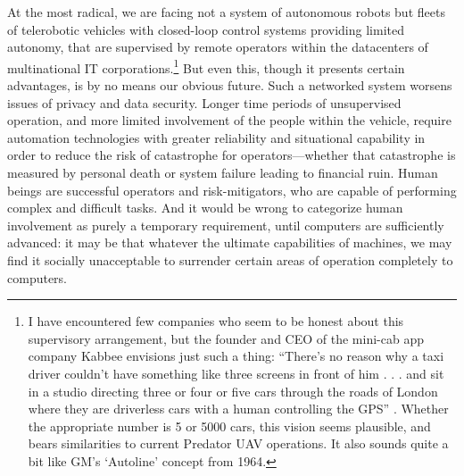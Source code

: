 
At the most radical, we are
facing not a system of autonomous robots but fleets of telerobotic
vehicles with closed-loop control systems providing limited autonomy,
that are supervised by remote operators within the datacenters of
multinational IT corporations.\footnote{I have encountered few
  companies who seem to be honest about this supervisory arrangement,
  but the founder and CEO of the mini-cab app company Kabbee envisions
just such a thing: ``There's no reason why a taxi driver couldn't have
something like three screens in front of him . . . and sit in a studio
directing three or four or five cars through the roads of London where
they are driverless cars with a human controlling the GPS''
\cite{forbesDawson}.
Whether the appropriate number is 5 or 5000 cars, this vision seems
plausible, and bears similarities to current Predator UAV operations.
It also sounds quite a bit like GM's `Autoline' concept from 1964.}
But even this, though it presents 
certain advantages, is by no means 
our obvious future. Such a networked system worsens issues of privacy
and data security. Longer time periods of unsupervised operation, and
more limited involvement of the people within the vehicle, require
automation technologies with greater reliability and situational
capability in order to reduce the risk of catastrophe for
operators---whether that catastrophe is measured by personal death or
system failure leading to financial ruin. Human beings are
successful operators and risk-mitigators, who are capable of
performing complex and difficult tasks. And it would be wrong to
categorize human involvement as purely a temporary requirement, until
computers are sufficiently advanced:  it
may be that whatever the ultimate capabilities of machines, we may
find it socially unacceptable to surrender certain areas of operation
completely to computers.


